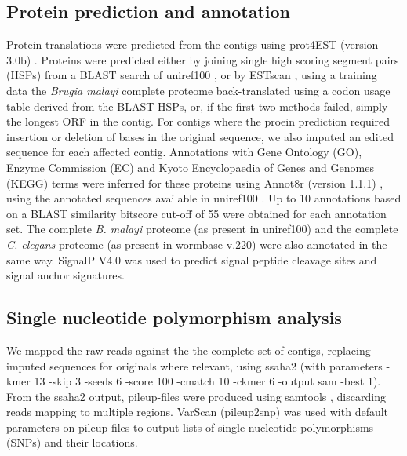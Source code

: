 \subsection*{Protein prediction and annotation}


Protein translations were predicted from the contigs using prot4EST
(version 3.0b) \cite{wasmuth_prot4est:_2004}. Proteins were predicted
either by joining single high scoring segment pairs (HSPs) from a
BLAST search of uniref100 \cite{pmid18836194}, or by ESTscan
\cite{estscan}, using a training data the \textit{Brugia malayi}
complete proteome back-translated using a codon usage table derived
from the BLAST HSPs, or, if the first two methods failed, simply the
longest ORF in the contig. For contigs where the proein prediction
required insertion or deletion of bases in the original sequence, we
also imputed an edited sequence for each affected contig. Annotations
with Gene Ontology (GO), Enzyme Commission (EC) and Kyoto
Encyclopaedia of Genes and Genomes (KEGG) terms were inferred for
these proteins using Annot8r (version 1.1.1)
\cite{schmid_annot8r:_2008}, using the annotated sequences available
in uniref100 \cite{pmid18836194}. Up to 10 annotations based on a
BLAST similarity bitscore cut-off of 55 were obtained for each
annotation set. The complete \textit{B. malayi} proteome (as present
in uniref100) and the complete \textit{C. elegans} proteome (as
present in wormbase v.220) were also annotated in the same
way. SignalP V4.0 \cite{pmid21959131} was used to predict signal
peptide cleavage sites and signal anchor signatures.

\subsection*{Single nucleotide polymorphism analysis}

We mapped the raw reads against the the complete set of contigs,
replacing imputed sequences for originals where relevant, using ssaha2
(with parameters -kmer 13 -skip 3 -seeds 6 -score 100 -cmatch 10
-ckmer 6 -output sam -best 1). From the ssaha2 output, pileup-files
were produced using samtools
\cite{journals/bioinformatics/LiHWFRHMAD09}, discarding reads mapping
to multiple regions. VarScan \cite{pmid19542151} (pileup2snp) was used
with default parameters on pileup-files to output lists of single
nucleotide polymorphisms (SNPs) and their locations.


